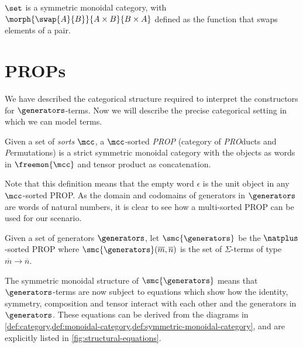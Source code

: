 \begin{example}
    \(\set\) is a symmetric monoidal category, with \(
        \morph{\swap{A}{B}}{A \times B}{B \times A}
    \) defined as the function that swaps elements of a pair.
\end{example}

\section{PROPs}

We have described the categorical structure required to interpret the
constructors for \(\generators\)-terms.
Now we will describe the precise categorical setting in which we can model
terms.

\begin{definition}
    Given a set of \emph{sorts} \(\mcc\), a \(\mcc\)-sorted \emph{PROP}
    (category of \emph{PRO}ducts and \emph{P}ermutations) is a strict symmetric
    monoidal category with the objects as words in \(\freemon{\mcc}\) and tensor
    product as concatenation.
\end{definition}

Note that this definition means that the empty word \(\epsilon\) is the unit
object in any \(\mcc\)-sorted PROP.
As the domain and codomains of generators in \(\generators\) are words of
natural numbers, it is clear to see how a multi-sorted PROP can be used for our
scenario.

\begin{definition}
    Given a set of generators \(\generators\), let \(\smc{\generators}\) be the
    \(\natplus\)-sorted PROP where \(
        \smc{\generators}(\overline{m}, \overline{n})
    \) is the set of \(\Sigma\)-terms of type \(\overline{m} \to \overline{n}\).
\end{definition}

The symmetric monoidal structure of \(\smc{\generators}\) means that
\(\generators\)-terms are now subject to equations which show how the identity,
symmetry, composition and tensor interact with each other and the generators in
\(\generators\).
These equations can be derived from the diagrams in
\cref{def:category,def:monoidal-category,def:symmetric-monoidal-category}, and
are explicitly listed in \cref{fig:structural-equations}.

